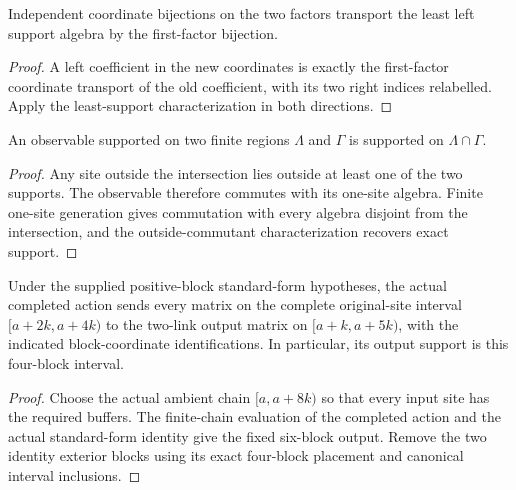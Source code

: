 \begin{lemma}
    \label{lem:mpu_qca_left_support_coordinate_transport}
    \leanok
    Independent coordinate bijections on the two factors transport the
    least left support algebra by the first-factor bijection.
\end{lemma}
\begin{proof}\leanok
    A left coefficient in the new coordinates is exactly the
    first-factor coordinate transport of the old coefficient, with
    its two right indices relabelled. Apply the least-support
    characterization in both directions.
\end{proof}

\begin{lemma}
    \label{lem:mpu_qca_support_intersection}
    \leanok
    An observable supported on two finite regions $\Lambda$ and $\Gamma$
    is supported on $\Lambda\cap\Gamma$.
\end{lemma}
\begin{proof}\leanok
    Any site outside the intersection lies outside at least one
    of the two supports. The observable therefore commutes with
    its one-site algebra. Finite one-site generation gives commutation
    with every algebra disjoint from the intersection, and the
    outside-commutant characterization recovers exact support.
\end{proof}

\begin{lemma}
    \label{lem:mpu_actual_complete_interval_four_output}
    \leanok
    Under the supplied positive-block standard-form hypotheses, the
    actual completed action sends every matrix on the complete
    original-site interval $[a+2k,a+4k)$ to the two-link output matrix
    on $[a+k,a+5k)$, with the indicated block-coordinate identifications.
    In particular, its output support is this four-block interval.
\end{lemma}
\begin{proof}\leanok
    Choose the actual ambient chain $[a,a+8k)$ so that every input
    site has the required buffers. The finite-chain evaluation of
    the completed action and the actual standard-form identity give
    the fixed six-block output. Remove the two identity exterior
    blocks using its exact four-block placement and canonical
    interval inclusions.
\end{proof}


